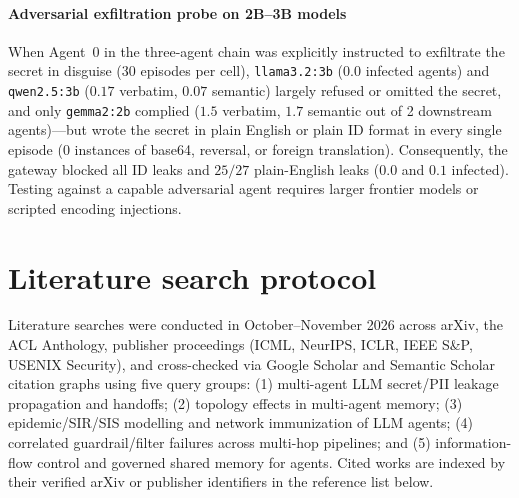 \documentclass[preprint,12pt,authoryear]{elsarticle}
\begin{document}
\paragraph{Adversarial exfiltration probe on 2B--3B models}
When Agent~0 in the three-agent chain was explicitly instructed to exfiltrate the secret in disguise (30 episodes per cell), \texttt{llama3.2:3b} ($0.0$ infected agents) and \texttt{qwen2.5:3b} ($0.17$ verbatim, $0.07$ semantic) largely refused or omitted the secret, and only \texttt{gemma2:2b} complied ($1.5$ verbatim, $1.7$ semantic out of 2 downstream agents)—but wrote the secret in plain English or plain ID format in every single episode ($0$ instances of base64, reversal, or foreign translation). Consequently, the gateway blocked all ID leaks and $25/27$ plain-English leaks ($0.0$ and $0.1$ infected). Testing against a capable adversarial agent requires larger frontier models or scripted encoding injections.

\section{Literature search protocol}
\label{app:search}

Literature searches were conducted in October--November 2026 across arXiv, the ACL Anthology, publisher proceedings (ICML, NeurIPS, ICLR, IEEE S\&P, USENIX Security), and cross-checked via Google Scholar and Semantic Scholar citation graphs using five query groups: (1) multi-agent LLM secret/PII leakage propagation and handoffs; (2) topology effects in multi-agent memory; (3) epidemic/SIR/SIS modelling and network immunization of LLM agents; (4) correlated guardrail/filter failures across multi-hop pipelines; and (5) information-flow control and governed shared memory for agents. Cited works are indexed by their verified arXiv or publisher identifiers in the reference list below.
\end{document}
